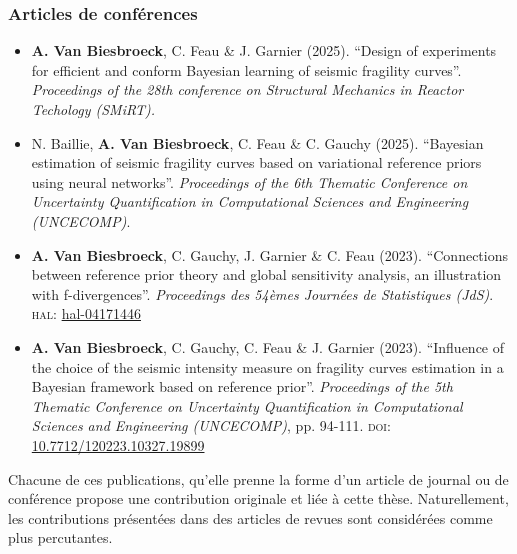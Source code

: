 \subsubsection{Articles de conférences}

\begin{itemize}
    \item \textbf{A. Van Biesbroeck}, C. Feau \& J. Garnier (2025). ``Design of experiments for efficient and conform Bayesian learning of seismic fragility curves''. \emph{Proceedings of the 28th conference on Structural Mechanics in Reactor Techology (SMiRT).}
    \item N. Baillie, \textbf{A. Van Biesbroeck}, C. Feau \& C. Gauchy (2025). ``Bayesian estimation of seismic fragility curves based on variational reference priors using neural networks''. \emph{Proceedings of the 6th Thematic Conference on Uncertainty Quantification in Computational Sciences and Engineering (UNCECOMP)}.
    \item \textbf{A. Van Biesbroeck}, C. Gauchy, J. Garnier \& C. Feau (2023). ``Connections between reference prior theory and global sensitivity analysis, an illustration with f-divergences''. \emph{Proceedings des 54èmes Journées de Statistiques (JdS)}. \textsc{hal:} \href{https://hal.science/hal-04171446}{hal-04171446}
    \item \textbf{A. Van Biesbroeck}, C. Gauchy, C. Feau \& J. Garnier (2023). ``Influence of the choice of the seismic intensity measure on fragility curves estimation in a Bayesian framework based on reference prior''. \emph{Proceedings of the 5th Thematic Conference on Uncertainty Quantification in Computational Sciences and Engineering (UNCECOMP)}, pp. 94-111. \textsc{doi:} \href{https://dx.doi.org/10.7712/120223.10327.19899}{10.7712/120223.10327.19899}
\end{itemize}


Chacune de ces publications, qu'elle prenne la forme d'un article de journal ou de conférence propose une contribution originale et liée à cette thèse. Naturellement, les contributions présentées dans des articles de revues sont considérées comme plus percutantes.

